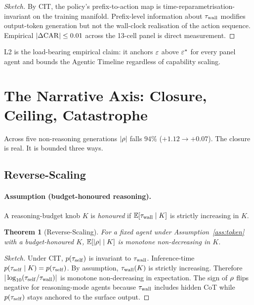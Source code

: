 \documentclass[letterpaper]{article}
\newtheorem{theorem}{Theorem}
\begin{document}
\begin{proof}[Sketch] By CIT, the policy's prefix-to-action map is time-reparametrisation-invariant on the training manifold. Prefix-level information about $\tau_{\mathrm{wall}}$ modifies output-token generation but not the wall-clock realisation of the action sequence. Empirical $|\Delta\mathrm{CAR}| \leq 0.01$ across the 13-cell panel is direct measurement. \end{proof}

L2 is the load-bearing empirical claim: it anchors $\varepsilon$ above $\varepsilon^{*}$ for every panel agent and bounds the Agentic Timeline regardless of capability scaling.

\section{The Narrative Axis: Closure, Ceiling, Catastrophe}
\label{sec:l3}

Across five non-reasoning generations $|\rho|$ falls $94\%$ ($+1.12 \to +0.07$). The closure is real. It is bounded three ways.

\subsection{Reverse-Scaling}
\label{ssec:rs}

\paragraph{Assumption (budget-honoured reasoning).}
\label{ass:bh}
A reasoning-budget knob $K$ is \emph{honoured} if $\mathbb{E}[\tau_{\mathrm{wall}} \mid K]$ is strictly increasing in $K$.

\begin{theorem}[Reverse-Scaling]
\label{thm:rs}
For a fixed agent under Assumption~\ref{ass:token} with a budget-honoured $K$, $\mathbb{E}[|\rho| \mid K]$ is monotone non-decreasing in $K$.
\end{theorem}

\begin{proof}[Sketch] Under CIT, $p(\tau_{\mathrm{self}})$ is invariant to $\tau_{\mathrm{wall}}$. Inference-time $p(\tau_{\mathrm{self}} \mid K) = p(\tau_{\mathrm{self}})$. By assumption, $\tau_{\mathrm{wall}}(K)$ is strictly increasing. Therefore $|\log_{10}(\tau_{\mathrm{self}}/\tau_{\mathrm{wall}})|$ is monotone non-decreasing in expectation. The sign of $\rho$ flips negative for reasoning-mode agents because $\tau_{\mathrm{wall}}$ includes hidden CoT while $p(\tau_{\mathrm{self}})$ stays anchored to the surface output. \end{proof}
\end{document}
